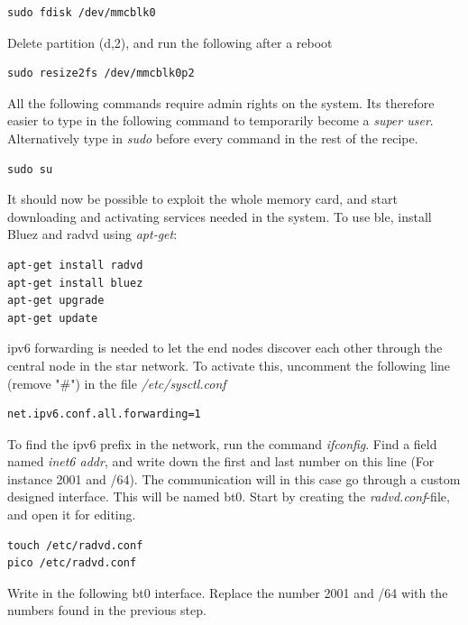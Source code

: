 \begin{verbatim}
sudo fdisk /dev/mmcblk0
\end{verbatim}

Delete partition (d,2), and run the following after a reboot

\begin{verbatim}
sudo resize2fs /dev/mmcblk0p2
\end{verbatim}

All the following commands require admin rights on the system. Its therefore easier to type in the following command to temporarily become a \textit{super user}. Alternatively type in \textit{sudo} before every command in the rest of the recipe.

\begin{verbatim}
sudo su
\end{verbatim} 

It should now be possible to exploit the whole memory card, and start downloading and activating services needed in the system. To use \gls{ble}, install Bluez and radvd using \textit{apt-get}:

\begin{verbatim}
apt-get install radvd
apt-get install bluez
apt-get upgrade
apt-get update
\end{verbatim}

\gls{ipv6} forwarding is needed to let the end nodes discover each other through the central node in the star network. To activate this, uncomment the following line (remove "\#") in the file \textit{/etc/sysctl.conf}

\begin{verbatim}
net.ipv6.conf.all.forwarding=1
\end{verbatim}

To find the \gls{ipv6} prefix in the network, run the command \textit{ifconfig}. Find a field named \textit{inet6 addr}, and write down the first and last number on this line (For instance 2001 and /64). 
The communication will in this case go through a custom designed interface. This will be named bt0. Start by creating the \textit{radvd.conf}-file, and open it for editing. 

\begin{verbatim}
touch /etc/radvd.conf
pico /etc/radvd.conf
\end{verbatim} 


Write in the following bt0 interface. Replace the number 2001 and /64 with the numbers found in the previous step. 

